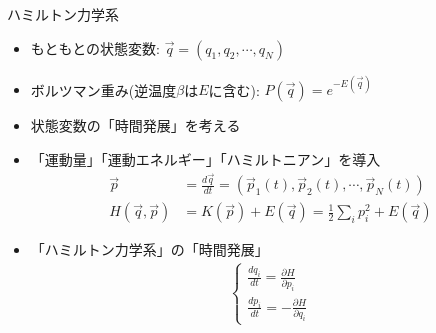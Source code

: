 
\begin{frame}[t,fragile]{ハミルトン力学系}
  \begin{itemize}
  \item もともとの状態変数: \(\vec{q} = (q_1,q_2,\cdots,q_N)\)
  \item ボルツマン重み(逆温度\(\beta\)は\(E\)に含む): \(P(\vec{q}) = e^{-E(\vec{q})}\)
  \item 状態変数の「時間発展」を考える
  \item 「運動量」「運動エネルギー」「ハミルトニアン」を導入
    \begin{align*}
      \vec{p} &= \frac{d\vec{q}}{dt} = (\vec{p}_1(t),\vec{p}_2(t),\cdots,\vec{p}_N(t)) \\
      H(\vec{q}, \vec{p}) &= K(\vec{p}) + E(\vec{q}) = \frac{1}{2}\sum_i p_i^2 + E(\vec{q})
    \end{align*}
  \item 「ハミルトン力学系」の「時間発展」
    \begin{align*}
      \begin{cases}
        \displaystyle
        \frac{dq_i}{dt} = \frac{\partial H}{\partial p_i} \\
        \displaystyle
        \frac{dp_i}{dt} = -\frac{\partial H}{\partial q_i}
      \end{cases}
    \end{align*}
\end{itemize}
\end{frame}
